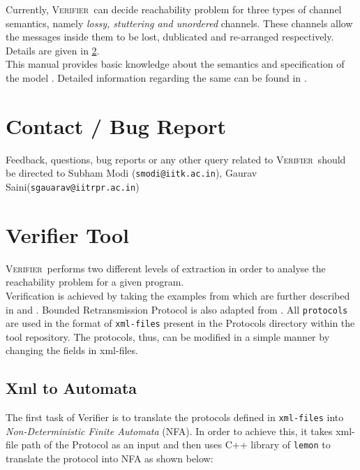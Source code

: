\documentclass[a4paper]{article}
\newcommand{\verifier}{\textsc{Verifier}}
\begin{document}
Currently, \verifier\ can decide reachability problem for three types of channel semantics, 
namely \emph{lossy, stuttering and unordered} channels. These channels allow the messages inside them 
to be lost, dublicated and re-arranged respectively. Details are
given in \cref{sec:logic}.\\


This manual provides basic knowledge about the semantics and specification of the model .
Detailed information regarding the same can be found in \cite{AAC13}.\\

\section{Contact / Bug Report}

Feedback, questions, bug reports or any other query related to \verifier\ should be directed to 
Subham Modi ({\tt smodi@iitk.ac.in}), Gaurav Saini({\tt sgauarav@iitrpr.ac.in}) \\

\section{Verifier Tool}\label{sec:logic}

\verifier\ performs two different levels of extraction in order to analyse the reachability 
problem for a given program.\\

Verification is achieved by taking the examples from \cite{JRSVgit} 
which are further described in \cite{MPSV11} and \cite{RSV11}.
Bounded Retransmission Protocol is also adapted from \cite{AABJ04}.
All {\tt protocols} are used in the format of {\tt xml-files} present in the Protocols directory
within the tool repository. The protocols, thus, can be modified in a simple manner 
by changing the fields in xml-files.

\subsection{Xml to Automata}

The first task of Verifier is to translate the protocols defined in {\tt xml-files} into 
\emph{Non-Deterministic Finite Automata} (NFA). In order to achieve this, it takes xml-file path of the Protocol 
as an input and then uses C++ library of {\tt lemon} to translate the protocol into NFA as shown below:\\
\end{document}

